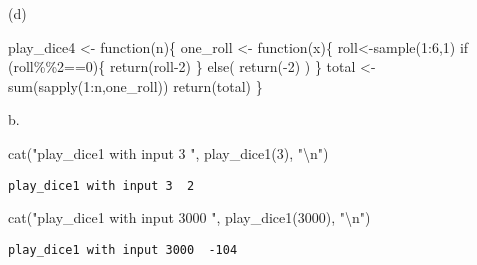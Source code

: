 \documentclass[
  letterpaper,
  DIV=11,
  numbers=noendperiod]{scrartcl}
\newenvironment{Shaded}{\begin{snugshade}}{\end{snugshade}}
\newcommand{\ControlFlowTok}[1]{\textcolor[rgb]{0.00,0.23,0.31}{#1}}
\newcommand{\DecValTok}[1]{\textcolor[rgb]{0.68,0.00,0.00}{#1}}
\newcommand{\FunctionTok}[1]{\textcolor[rgb]{0.28,0.35,0.67}{#1}}
\newcommand{\NormalTok}[1]{\textcolor[rgb]{0.00,0.23,0.31}{#1}}
\newcommand{\OtherTok}[1]{\textcolor[rgb]{0.00,0.23,0.31}{#1}}
\newcommand{\SpecialCharTok}[1]{\textcolor[rgb]{0.37,0.37,0.37}{#1}}
\newcommand{\StringTok}[1]{\textcolor[rgb]{0.13,0.47,0.30}{#1}}
\begin{document}
(d)

\begin{Shaded}
\begin{Highlighting}[]
\NormalTok{play\_dice4 }\OtherTok{\textless{}{-}} \ControlFlowTok{function}\NormalTok{(n)\{}
\NormalTok{  one\_roll }\OtherTok{\textless{}{-}} \ControlFlowTok{function}\NormalTok{(x)\{}
\NormalTok{    roll}\OtherTok{\textless{}{-}}\FunctionTok{sample}\NormalTok{(}\DecValTok{1}\SpecialCharTok{:}\DecValTok{6}\NormalTok{,}\DecValTok{1}\NormalTok{)}
    \ControlFlowTok{if}\NormalTok{ (roll}\SpecialCharTok{\%\%}\DecValTok{2}\SpecialCharTok{==}\DecValTok{0}\NormalTok{)\{}
      \FunctionTok{return}\NormalTok{(roll}\DecValTok{{-}2}\NormalTok{)}
\NormalTok{    \} }\ControlFlowTok{else}\NormalTok{(}
      \FunctionTok{return}\NormalTok{(}\SpecialCharTok{{-}}\DecValTok{2}\NormalTok{)}
\NormalTok{    )}
\NormalTok{  \}}
\NormalTok{  total }\OtherTok{\textless{}{-}} \FunctionTok{sum}\NormalTok{(}\FunctionTok{sapply}\NormalTok{(}\DecValTok{1}\SpecialCharTok{:}\NormalTok{n,one\_roll))}
  \FunctionTok{return}\NormalTok{(total)}
\NormalTok{\}}
\end{Highlighting}
\end{Shaded}

b.

\begin{Shaded}
\begin{Highlighting}[]
\FunctionTok{cat}\NormalTok{(}\StringTok{"play\_dice1 with input 3 "}\NormalTok{, }\FunctionTok{play\_dice1}\NormalTok{(}\DecValTok{3}\NormalTok{), }\StringTok{"}\SpecialCharTok{\textbackslash{}n}\StringTok{"}\NormalTok{)}
\end{Highlighting}
\end{Shaded}

\begin{verbatim}
play_dice1 with input 3  2 
\end{verbatim}

\begin{Shaded}
\begin{Highlighting}[]
\FunctionTok{cat}\NormalTok{(}\StringTok{"play\_dice1 with input 3000 "}\NormalTok{, }\FunctionTok{play\_dice1}\NormalTok{(}\DecValTok{3000}\NormalTok{), }\StringTok{"}\SpecialCharTok{\textbackslash{}n}\StringTok{"}\NormalTok{)}
\end{Highlighting}
\end{Shaded}

\begin{verbatim}
play_dice1 with input 3000  -104 
\end{verbatim}
\end{document}
